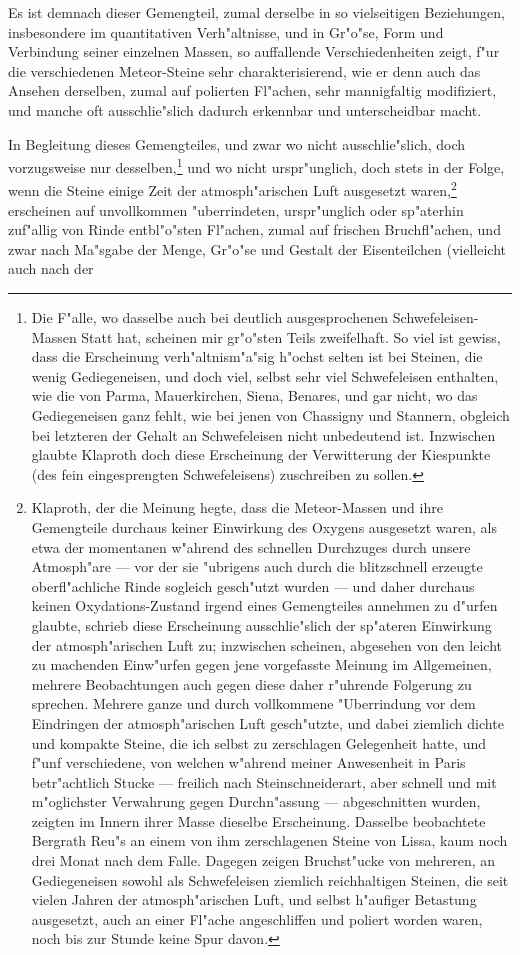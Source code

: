 \documentclass[a4paper, 11pt, oneside, german]{article}
\begin{document}
Es ist demnach dieser Gemengteil, zumal derselbe in so vielseitigen Beziehungen, insbesondere im quantitativen Verh"altnisse, und in Gr"o"se, Form und Verbindung seiner einzelnen Massen, so auffallende Verschiedenheiten zeigt, f"ur die verschiedenen Meteor-Steine sehr charakterisierend, wie er denn auch das Ansehen derselben, zumal auf polierten Fl"achen, sehr mannigfaltig modifiziert, und manche oft ausschlie"slich dadurch erkennbar und unterscheidbar macht.

In Begleitung dieses Gemengteiles, und zwar wo nicht ausschlie"slich, doch vorzugsweise nur desselben,\footnote{Die F"alle, wo dasselbe auch bei deutlich ausgesprochenen Schwefeleisen-Massen Statt hat, scheinen mir gr"o"sten Teils zweifelhaft. So viel ist gewiss, dass die Erscheinung verh"altnism"a"sig h"ochst selten ist bei Steinen, die wenig Gediegeneisen, und doch viel, selbst sehr viel Schwefeleisen enthalten, wie die von Parma, Mauerkirchen, Siena, Benares, und gar nicht, wo das Gediegeneisen ganz fehlt, wie bei jenen von Chassigny und Stannern, obgleich bei letzteren der Gehalt an Schwefeleisen nicht unbedeutend ist. Inzwischen glaubte Klaproth doch diese Erscheinung der Verwitterung der Kiespunkte (des fein eingesprengten Schwefeleisens) zuschreiben zu sollen.} und wo nicht urspr"unglich, doch stets in der Folge, wenn die Steine einige Zeit der atmosph"arischen Luft ausgesetzt waren,\footnote{Klaproth, der die Meinung hegte, dass die Meteor-Massen und ihre Gemengteile durchaus keiner Einwirkung des Oxygens ausgesetzt waren, als etwa der momentanen w"ahrend des schnellen Durchzuges durch unsere Atmosph"are --- vor der sie "ubrigens auch durch die blitzschnell erzeugte oberfl"achliche Rinde sogleich gesch"utzt wurden --- und daher durchaus keinen Oxydations-Zustand irgend eines Gemengteiles annehmen zu d"urfen glaubte, schrieb diese Erscheinung ausschlie"slich der sp"ateren Einwirkung der atmosph"arischen Luft zu; inzwischen scheinen, abgesehen von den leicht zu machenden Einw"urfen gegen jene vorgefasste Meinung im Allgemeinen, mehrere Beobachtungen auch gegen diese daher r"uhrende Folgerung zu sprechen. Mehrere ganze und durch vollkommene "Uberrindung vor dem Eindringen der atmosph"arischen Luft gesch"utzte, und dabei ziemlich dichte und kompakte Steine, die ich selbst zu zerschlagen Gelegenheit hatte, und f"unf verschiedene, von welchen w"ahrend meiner Anwesenheit in Paris betr"achtlich Stucke --- freilich nach Steinschneiderart, aber schnell und mit m"oglichster Verwahrung gegen Durchn"assung --- abgeschnitten wurden, zeigten im Innern ihrer Masse dieselbe Erscheinung. Dasselbe beobachtete Bergrath Reu"s an einem von ihm zerschlagenen Steine von Lissa, kaum noch drei Monat nach dem Falle. Dagegen zeigen Bruchst"ucke von mehreren, an Gediegeneisen sowohl als Schwefeleisen ziemlich reichhaltigen Steinen, die seit vielen Jahren der atmosph"arischen Luft, und selbst h"aufiger Betastung ausgesetzt, auch an einer Fl"ache angeschliffen und poliert worden waren, noch bis zur Stunde keine Spur davon.} erscheinen auf unvollkommen "uberrindeten, urspr"unglich oder sp"aterhin zuf"allig von Rinde entbl"o"sten Fl"achen, zumal auf frischen Bruchfl"achen, und zwar nach Ma"sgabe der Menge, Gr"o"se und Gestalt der Eisenteilchen (vielleicht auch nach der 
\end{document}
